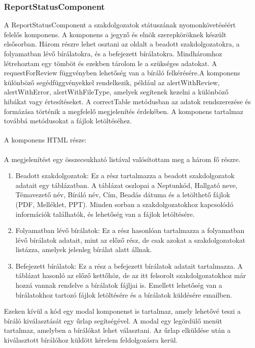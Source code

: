 \subsubsection{ReportStatusComponent}

A ReportStatusComponent a szakdolgozatok státuszának nyomonkövetéséért felelős komponens. A komponens a jegyző és elnök szerepköröknek készült elsősorban. Három részre lehet osztani az oldalt a beadott szakdolgozatokra, a folyamatban lévő bírálatokra, és a befejezett bírálatokra. Mindháromhoz létrehoztam egy tömböt és ezekben tárolom le a szükséges adatokat. A requestForReview függvényben lehetőség van a bíráló felkérésére.A komponens különböző segédfüggvényekkel rendelkezik, például az alertWithReview, alertWithError, alertWithFileType, amelyek segítenek kezelni a különböző hibákat vagy értesítéseket. A correctTable metódusban az adatok rendszerezése és formázása történik a megfelelő megjelenítés érdekében. A komponens tartalmaz továbbá metódusokat a fájlok letöltéséhez.\\
\\
A komponens HTML része:\\
\\
A megjelenítést egy összecsukható listával valósítottam meg a három fő részre.
\\
\begin{enumerate}

\item{} Beadott szakdolgozatok: Ez a rész tartalmazza a beadott szakdolgozatok adatait egy táblázatban. A táblázat oszlopai a Neptunkód, Hallgató neve, Témavezető név, Bíráló név, Cím, Beadás dátuma és a letölthető fájlok (PDF, Melléklet, PPT). Minden sorban a szakdolgozatokhoz kapcsolódó információk találhatók, és lehetőség van a fájlok letöltésére.

\item{} Folyamatban lévő bírálatok: Ez a rész hasonlóan tartalmazza a folyamatban lévő bírálatok adatait, mint az előző rész, de csak azokat a szakdolgozatokat listázza, amelyek jelenleg bírálat alatt állnak.

\item{} Befejezett bírálatok: Ez a rész a befejezett bírálatok adatait tartalmazza. A táblázat hasonló az előző kettőhöz, de az itt felsorolt szakdolgozatokhoz már hozzá vannak rendelve a bírálatok fájljai is. Emellett lehetőség van a bírálatokhoz tartozó fájlok letöltésére és a bírálatok küldésére emailben.\\
\end{enumerate}
Ezeken kívül a kód egy modal komponenst is tartalmaz, amely lehetővé teszi a bíráló kiválasztását egy űrlap segítségével. A modal egy legördülő menüt tartalmaz, amelyben a bírálókat lehet választani. Az űrlap elküldése után a kiválasztott bírálóhoz küldött kérelem feldolgozásra kerül.

